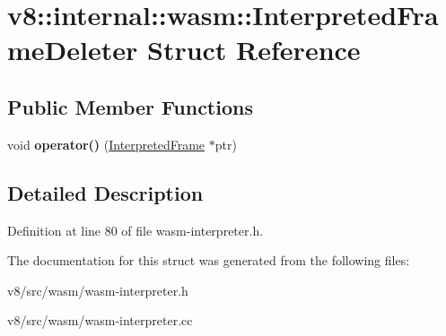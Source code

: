 \hypertarget{structv8_1_1internal_1_1wasm_1_1InterpretedFrameDeleter}{}\section{v8\+:\+:internal\+:\+:wasm\+:\+:Interpreted\+Frame\+Deleter Struct Reference}
\label{structv8_1_1internal_1_1wasm_1_1InterpretedFrameDeleter}
\subsection*{Public Member Functions}
\begin{DoxyCompactItemize}
\item 
\mbox{\label{structv8_1_1internal_1_1wasm_1_1InterpretedFrameDeleter_a8b135356bbf784a9413d0c989fa1e1b7}} 
void {\bfseries operator()} (\mbox{\hyperlink{classv8_1_1internal_1_1wasm_1_1InterpretedFrame}{Interpreted\+Frame}} $\ast$ptr)
\end{DoxyCompactItemize}


\subsection{Detailed Description}


Definition at line 80 of file wasm-\/interpreter.\+h.



The documentation for this struct was generated from the following files\+:\begin{DoxyCompactItemize}
\item 
v8/src/wasm/wasm-\/interpreter.\+h\item 
v8/src/wasm/wasm-\/interpreter.\+cc\end{DoxyCompactItemize}
